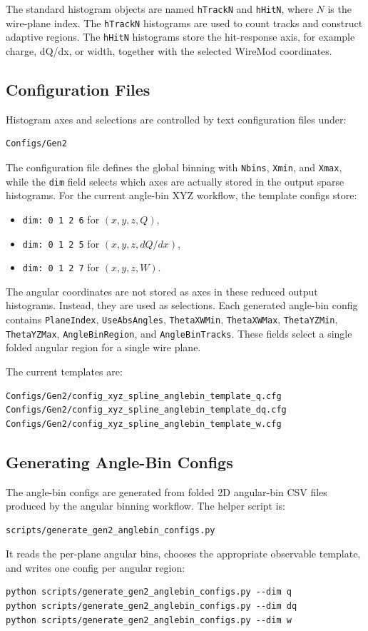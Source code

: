 \documentclass{article}
\begin{document}
The standard histogram objects are named \texttt{hTrackN} and \texttt{hHitN}, where $N$ is the wire-plane index. The \texttt{hTrackN} histograms are used to count tracks and construct adaptive regions. The \texttt{hHitN} histograms store the hit-response axis, for example charge, dQ/dx, or width, together with the selected WireMod coordinates.

\subsection{Configuration Files}

Histogram axes and selections are controlled by text configuration files under:
\begin{verbatim}
Configs/Gen2
\end{verbatim}
The configuration file defines the global binning with \texttt{Nbins}, \texttt{Xmin}, and \texttt{Xmax}, while the \texttt{dim} field selects which axes are actually stored in the output sparse histograms. For the current angle-bin XYZ workflow, the template configs store:
\begin{itemize}
    \item \texttt{dim: 0 1 2 6} for $(x,y,z,Q)$,
    \item \texttt{dim: 0 1 2 5} for $(x,y,z,dQ/dx)$,
    \item \texttt{dim: 0 1 2 7} for $(x,y,z,W)$.
\end{itemize}

The angular coordinates are not stored as axes in these reduced output histograms. Instead, they are used as selections. Each generated angle-bin config contains \texttt{PlaneIndex}, \texttt{UseAbsAngles}, \texttt{ThetaXWMin}, \texttt{ThetaXWMax}, \texttt{ThetaYZMin}, \texttt{ThetaYZMax}, \texttt{AngleBinRegion}, and \texttt{AngleBinTracks}. These fields select a single folded angular region for a single wire plane.

The current templates are:
\begin{verbatim}
Configs/Gen2/config_xyz_spline_anglebin_template_q.cfg
Configs/Gen2/config_xyz_spline_anglebin_template_dq.cfg
Configs/Gen2/config_xyz_spline_anglebin_template_w.cfg
\end{verbatim}

\subsection{Generating Angle-Bin Configs}

The angle-bin configs are generated from folded 2D angular-bin CSV files produced by the angular binning workflow. The helper script is:
\begin{verbatim}
scripts/generate_gen2_anglebin_configs.py
\end{verbatim}
It reads the per-plane angular bins, chooses the appropriate observable template, and writes one config per angular region:
\begin{verbatim}
python scripts/generate_gen2_anglebin_configs.py --dim q
python scripts/generate_gen2_anglebin_configs.py --dim dq
python scripts/generate_gen2_anglebin_configs.py --dim w
\end{verbatim}
\end{document}
